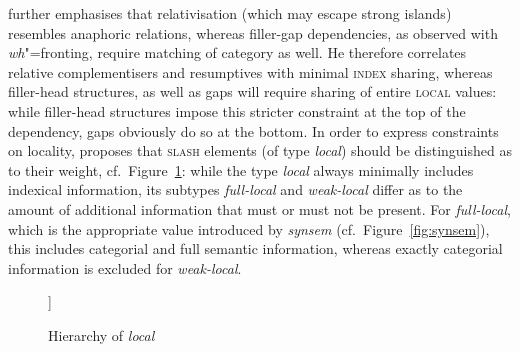 \documentclass[output=paper,biblatex,babelshorthands,newtxmath,draftmode,colorlinks,citecolor=brown]{langscibook}
\begin{document}
\noindent
\citet{Crysmann2012b-u} further emphasises that relativisation (which
may escape strong islands) resembles anaphoric relations, whereas
filler-gap dependencies, as observed with \emph{wh}"=fronting, require
matching of category as well. He therefore correlates relative
complementisers and resumptives with minimal \textsc{index} sharing,
whereas filler-head structures, as well as gaps will require sharing
of entire \textsc{local} values: while filler-head structures impose
this stricter constraint at the top of the dependency, gaps obviously
do so at the bottom. In order to express constraints on locality,
\citet{Crysmann:12,Crysmann:16} proposes that \textsc{slash} elements
(of type \textit{local}) should be distinguished as to their weight,
cf.~Figure~\ref{fig:local}: while the type \textit{local} always
minimally includes indexical information, its subtypes
\textit{full-local} and \textit{weak-local} differ as to the amount of
additional information that must or must not be present. For
\textit{full-local}, which is the appropriate value introduced by
\textit{synsem} (cf.~Figure~\ref{fig:synsem}), this includes
categorial and full semantic information, whereas exactly categorial
information is excluded for \textit{weak-local}.



%  
%
%
%
%



\begin{figure}
	\centering

\begin{forest}
[%
\avm{
	[\type*{local} 
	cont &	[index & ind ] ]
}%
	[%
	\avm{
		[\type*{full-local}
		cat & cat ]
	}]
	[%
	\avm{
		[\type*{weak-local}
		cont &	[rels <  > ] ]
	}]
]
\end{forest}  
  
\caption{\label{fig:local}Hierarchy of \textit{local} \citep[]{Crysmann:16}}
  
\end{figure}
\end{document}
